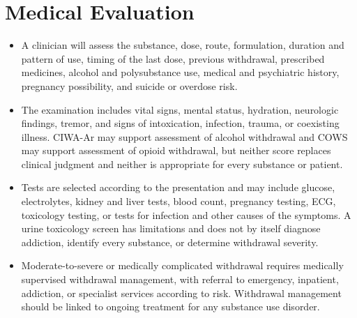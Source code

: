 \section*{Medical Evaluation}
\begin{itemize}
 \item A clinician will assess the substance, dose, route, formulation, duration and pattern of use, timing of the last dose, previous withdrawal, prescribed medicines, alcohol and polysubstance use, medical and psychiatric history, pregnancy possibility, and suicide or overdose risk.
 \item The examination includes vital signs, mental status, hydration, neurologic findings, tremor, and signs of intoxication, infection, trauma, or coexisting illness. CIWA-Ar may support assessment of alcohol withdrawal and COWS may support assessment of opioid withdrawal, but neither score replaces clinical judgment and neither is appropriate for every substance or patient.
 \item Tests are selected according to the presentation and may include glucose, electrolytes, kidney and liver tests, blood count, pregnancy testing, ECG, toxicology testing, or tests for infection and other causes of the symptoms. A urine toxicology screen has limitations and does not by itself diagnose addiction, identify every substance, or determine withdrawal severity.
 \item Moderate-to-severe or medically complicated withdrawal requires medically supervised withdrawal management, with referral to emergency, inpatient, addiction, or specialist services according to risk. Withdrawal management should be linked to ongoing treatment for any substance use disorder.
\end{itemize}


